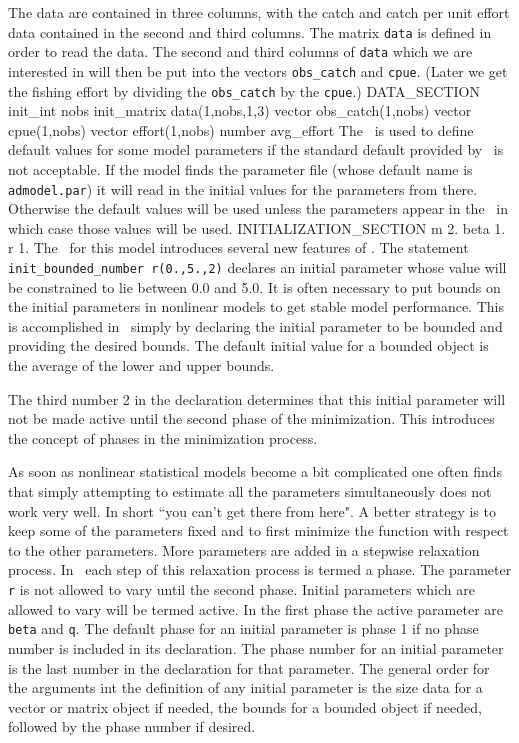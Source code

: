 \documentclass[12pt]{book}
\begin{document}
\endexample
The data are contained in three
columns, with the catch and catch per unit effort data contained
in the second and third columns. The matrix {\tt data} is
defined in order to read the data. The second and third columns 
of {\tt data} which we are interested in will then be put into
the vectors {\tt obs\_catch} and {\tt cpue}. (Later we get the fishing
effort by dividing the {\tt obs\_catch} by the {\tt cpue}.)
\beginexample
DATA_SECTION
  init_int nobs
  init_matrix data(1,nobs,1,3)
  vector obs_catch(1,nobs)
  vector cpue(1,nobs)
  vector effort(1,nobs)
  number avg_effort
\endexample
The \IS\ is used to define default values for
some model parameters if the standard default provided by 
\ADM\ is not acceptable. 
If the model finds the parameter file (whose default name
is {\tt admodel.par}) it will read in the initial values for
the parameters from there. Otherwise the default values will be used
unless the parameters appear in the \IS\ in which case those 
values will be used. 
\beginexample
INITIALIZATION_SECTION
  m 2.
  beta 1.
  r 1.
\endexample
{}
The \PS\ for this model  introduces  several new features of \ADM.
The statement \hbox{\tt init\_bounded\_number r(0.,5.,2)}
declares an initial parameter whose value will be constrained to lie
between 0.0 and 5.0. It is often necessary to put bounds on
the initial parameters in nonlinear models to 
get stable model performance. This is accomplished in
\ADM\ simply by declaring the initial parameter to
be bounded and providing the desired bounds. 
The default initial value for a bounded object is
the average of the lower and upper bounds.

 The third number 2 in the declaration determines that
this initial parameter will not be made active until the second
phase of the minimization. This introduces the
concept of phases in the minimization process. 

As soon as nonlinear statistical models become a bit
complicated one often finds that simply attempting to
estimate all the parameters simultaneously does not
work very well. In short ``you can't get there from here". 
A better strategy is to keep some of the
parameters fixed and to first minimize the function 
with respect to the other parameters. More 
parameters are added in a stepwise relaxation process.
In \ADM\ each step of this relaxation process is termed a phase.
The parameter {\tt r} is not allowed to vary until
the second phase. Initial parameters which are allowed to
vary will be termed active. In the first phase
the active parameter are {\tt beta} and
{\tt q}. The default phase for an initial parameter
is phase 1 if no phase number is included in its declaration. 
The phase
number for an initial parameter is the last number in the
declaration for that parameter. The general order for the arguments
int the definition of
any initial parameter is the size data for
a vector or matrix object if needed, the bounds 
for a bounded object if needed, followed by
the phase number if desired. 
\end{document}
